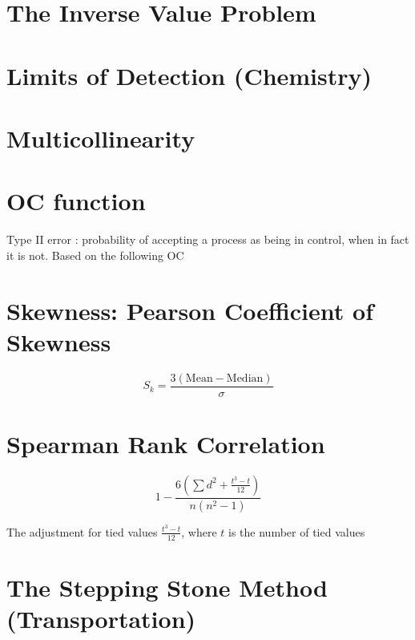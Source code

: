 \section{The Inverse Value Problem }

\section{Limits of Detection (Chemistry) }


\section{Multicollinearity}


\section{OC function}
Type II error : probability of accepting a process as being in control, when in fact it is not.
Based on the following OC



\section{Skewness: Pearson Coefficient of Skewness}

\[S_k = \frac{3(\mbox{Mean} - \mbox{Median} )}{\sigma} \]




\section{Spearman Rank Correlation}

\[ 1 - \frac{6\left( \sum d^2 + \frac{t^3-t}{12} \right)}{n(n^2-1)} \]

The adjustment for tied values
$ \frac{t^3-t}{12} $, where $t$ is the number of tied values


\section{The Stepping Stone Method (Transportation)}


